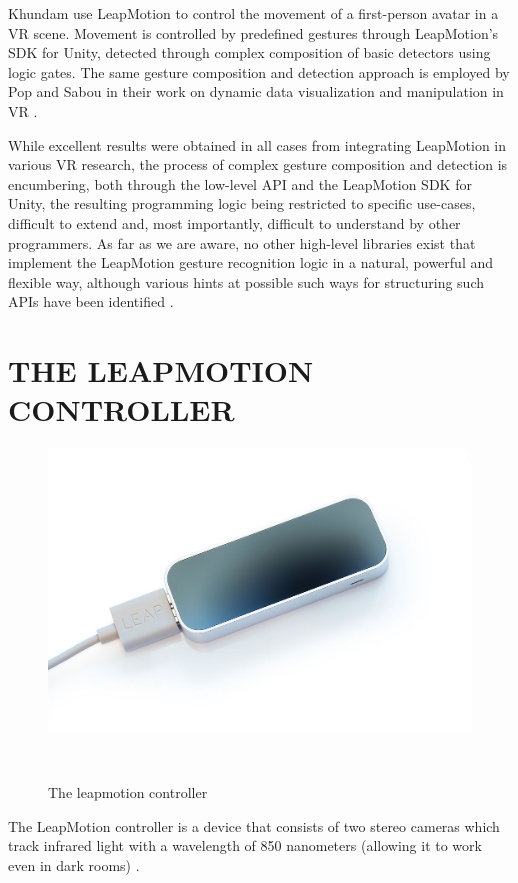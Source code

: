 \documentclass[chi_draft]{sigchi}
\def\leap{LeapMotion}
\begin{document}
Khundam \cite{Khundam} use \leap{} to control the movement of a first-person avatar in a VR scene. Movement is controlled by predefined gestures through \leap{}'s SDK for Unity, detected through complex composition of basic detectors using logic gates. The same gesture composition and detection approach is employed by Pop and Sabou in their work on dynamic data visualization and manipulation in VR \cite{Pop}.

While excellent results were obtained in all cases from integrating \leap{} in various VR research, the process of complex gesture composition and detection is encumbering, both through the low-level API and the \leap{} SDK for Unity, the resulting programming logic being restricted to specific use-cases, difficult to extend and, most importantly, difficult to understand by other programmers. As far as we are aware, no other high-level libraries exist that implement the \leap{} gesture recognition logic in a natural, powerful and flexible way, although various hints at possible such ways for structuring such APIs have been identified \cite{zuhlke}.

\section{THE LEAPMOTION CONTROLLER}

\begin{figure}[b]
\centering
  \includegraphics[width=0.9\columnwidth]{figures/LeapMotion_controller}
  \caption{The leapmotion controller}~\label{fig:figure1}
\end{figure}

The \leap{} controller is a device that consists of two stereo cameras which track infrared light with a wavelength of 850 nanometers (allowing it to work even in dark rooms) \cite{LeapArticle}.
\end{document}
